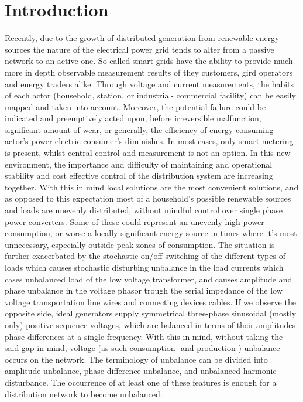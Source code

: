 \chapter{Introduction}

Recently, due to the growth of distributed generation from renewable energy sources the nature of the electrical power grid tends to alter from a passive network to an active one. So called smart grids have the ability to provide much more in depth observable measurement results of they customers, gird operators and energy traders alike. Through voltage and current measurements, the habits of each actor (household, station, or industrial- commercial facility) can be easily mapped and taken into account. Moreover, the potential failure could be indicated and preemptively acted upon, before irreversible malfunction, significant amount of wear, or generally, the efficiency of energy consuming actor's power electric consumer's diminishes. In most cases, only smart metering is present, whilst central control and measurement is not an option.
 In this new environment, the importance and difficulty of maintaining and operational stability and cost effective control of the distribution system are increasing together. With this in mind local solutions are the most convenient solutions, and as opposed to this expectation most of a household's possible renewable sources and loads are unevenly distributed, without mindful control over single phase power converters. Some of these could represent an unevenly high power consumption, or worse a locally significant energy source in times where it's most unnecessary, especially outside peak zones of consumption. The situation is further exacerbated by the stochastic on/off switching of the different types of loads which causes stochastic disturbing unbalance in the load currents which cases unbalanced load of the low voltage transformer, and causes amplitude and phase unbalance in the voltage phasor trough the serial impedance of the low voltage transportation line wires and connecting devices cables.
If we observe the opposite side, ideal generators supply symmetrical three-phase sinusoidal (mostly only) positive sequence voltages, which are balanced in terms of their amplitudes phase differences at a single frequency. With this in mind, without taking the said gap in mind, voltage (as such consumption- and production-) unbalance occurs on the network. The terminology of unbalance can be divided into amplitude unbalance, phase difference unbalance, and unbalanced harmonic disturbance. The occurrence of at least one of these features is enough for a distribution network to become unbalanced. 
